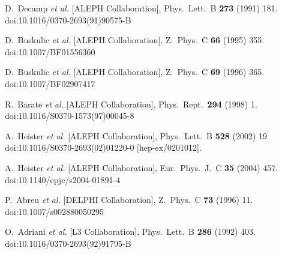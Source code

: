 \documentclass[aps,preprint,floatfix,nofootinbib,showpacs]{revtex4-1}
\begin{document}
\clearpage 
\begin{thebibliography}{99}

  D.~Decamp {\it et al.} [ALEPH Collaboration],
  Phys.\ Lett.\ B {\bf 273} (1991) 181.
  doi:10.1016/0370-2693(91)90575-B
  
  D.~Buskulic {\it et al.} [ALEPH Collaboration],
  Z.\ Phys.\ C {\bf 66} (1995) 355.
  doi:10.1007/BF01556360
  
  D.~Buskulic {\it et al.} [ALEPH Collaboration],
  Z.\ Phys.\ C {\bf 69} (1996) 365.
  doi:10.1007/BF02907417
  
  R.~Barate {\it et al.} [ALEPH Collaboration],
  Phys.\ Rept.\  {\bf 294} (1998) 1.
  doi:10.1016/S0370-1573(97)00045-8
  
  A.~Heister {\it et al.} [ALEPH Collaboration],
  Phys.\ Lett.\ B {\bf 528} (2002) 19
  doi:10.1016/S0370-2693(02)01220-0
  [hep-ex/0201012].
  
  A.~Heister {\it et al.} [ALEPH Collaboration],
  Eur.\ Phys.\ J.\ C {\bf 35} (2004) 457.
  doi:10.1140/epjc/s2004-01891-4
  
  P.~Abreu {\it et al.} [DELPHI Collaboration],
  Z.\ Phys.\ C {\bf 73} (1996) 11.
  doi:10.1007/s002880050295
  

  O.~Adriani {\it et al.} [L3 Collaboration],
  Phys.\ Lett.\ B {\bf 286} (1992) 403.
  doi:10.1016/0370-2693(92)91795-B
  

\end{thebibliography}
\end{document}
